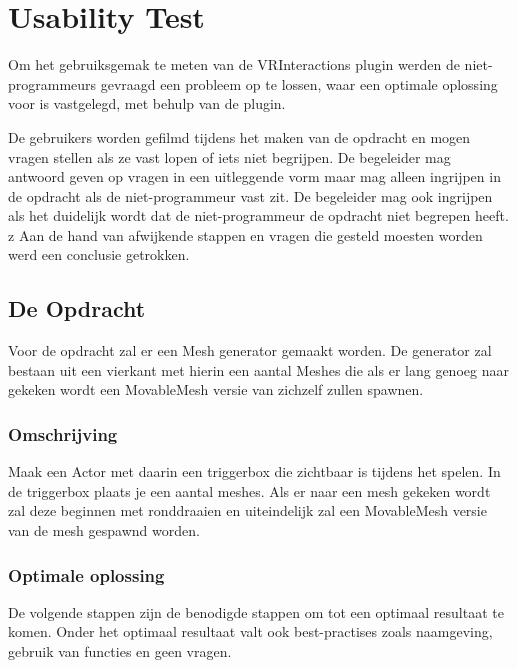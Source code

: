
\chapter{Usability Test}
\label{appendix:usertest1}
\lhead{}

Om het gebruiksgemak te meten van de VRInteractions plugin werden de niet-programmeurs gevraagd een probleem op te lossen, waar een optimale oplossing voor is vastgelegd, met behulp van de plugin. 

De gebruikers worden gefilmd tijdens het maken van de opdracht en mogen vragen stellen als ze vast lopen of iets niet begrijpen. De begeleider mag antwoord geven op vragen in een uitleggende vorm maar mag alleen ingrijpen in de opdracht als de niet-programmeur vast zit. De begeleider mag ook ingrijpen als het duidelijk wordt dat de niet-programmeur de opdracht niet begrepen heeft.
z
Aan de hand van afwijkende stappen en vragen die gesteld moesten worden werd een conclusie getrokken.

\section{De Opdracht}
Voor de opdracht zal er een Mesh generator gemaakt worden. De generator zal bestaan uit een vierkant met hierin een aantal Meshes die als er lang genoeg naar gekeken wordt een MovableMesh versie van zichzelf zullen spawnen.

\subsection{Omschrijving}
Maak een Actor met daarin een triggerbox die zichtbaar is tijdens het spelen. In de triggerbox plaats je een aantal meshes. Als er naar een mesh gekeken wordt zal deze beginnen met ronddraaien en uiteindelijk zal een MovableMesh versie van de mesh gespawnd worden. 

\subsection{Optimale oplossing}
De volgende stappen zijn de benodigde stappen om tot een optimaal resultaat te komen. Onder het optimaal resultaat valt ook best-practises zoals naamgeving, gebruik van functies en geen vragen.

